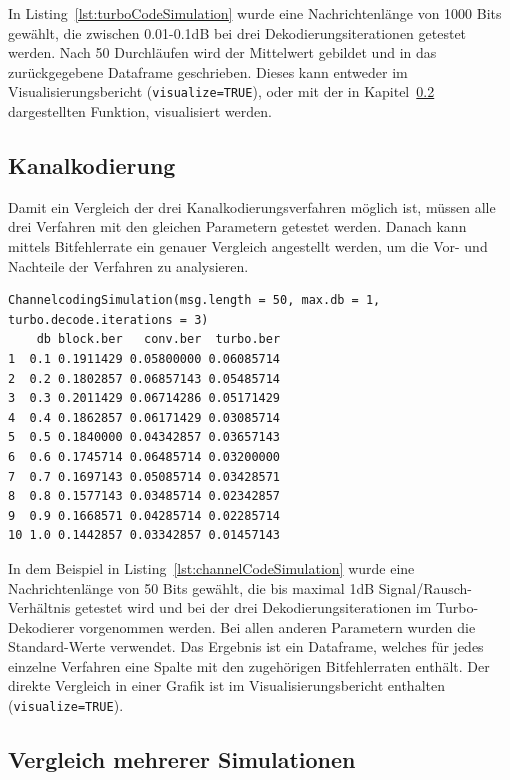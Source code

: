 In Listing~\ref{lst:turboCodeSimulation} wurde eine Nachrichtenlänge von 1000 Bits gewählt, die zwischen 0.01-0.1dB bei drei Dekodierungsiterationen getestet werden. Nach 50 Durchläufen wird der Mittelwert gebildet und in das zurückgegebene Dataframe geschrieben. Dieses kann entweder im Visualisierungsbericht (\texttt{visualize=TRUE}), oder mit der in Kapitel~\ref{sec:example_simulations_plot} dargestellten Funktion, visualisiert werden.

\FloatBarrier
\subsection{Kanalkodierung}
\label{sec:example_simulations_channel}

Damit ein Vergleich der drei Kanalkodierungsverfahren möglich ist, müssen alle drei Verfahren mit den gleichen Parametern getestet werden. Danach kann mittels Bitfehlerrate ein genauer Vergleich angestellt werden, um die Vor- und Nachteile der Verfahren zu analysieren.

\begin{lstlisting}[caption=Kanalkodierungs-Simulation, label={lst:channelCodeSimulation}, float=!th]
ChannelcodingSimulation(msg.length = 50, max.db = 1, turbo.decode.iterations = 3)
    db block.ber   conv.ber  turbo.ber
1  0.1 0.1911429 0.05800000 0.06085714
2  0.2 0.1802857 0.06857143 0.05485714
3  0.3 0.2011429 0.06714286 0.05171429
4  0.4 0.1862857 0.06171429 0.03085714
5  0.5 0.1840000 0.04342857 0.03657143
6  0.6 0.1745714 0.06485714 0.03200000
7  0.7 0.1697143 0.05085714 0.03428571
8  0.8 0.1577143 0.03485714 0.02342857
9  0.9 0.1668571 0.04285714 0.02285714
10 1.0 0.1442857 0.03342857 0.01457143
\end{lstlisting}

In dem Beispiel in Listing~\ref{lst:channelCodeSimulation} wurde eine Nachrichtenlänge von 50 Bits gewählt, die bis maximal 1dB Signal/Rausch-Verhältnis getestet wird und bei der drei Dekodierungsiterationen im Turbo-Dekodierer vorgenommen werden. Bei allen anderen Parametern wurden die Standard-Werte verwendet. Das Ergebnis ist ein Dataframe, welches für jedes einzelne Verfahren eine Spalte mit den zugehörigen Bitfehlerraten enthält. Der direkte Vergleich in einer Grafik ist im Visualisierungsbericht enthalten (\texttt{visualize=TRUE}). 

\FloatBarrier
\subsection{Vergleich mehrerer Simulationen}
\label{sec:example_simulations_plot}

